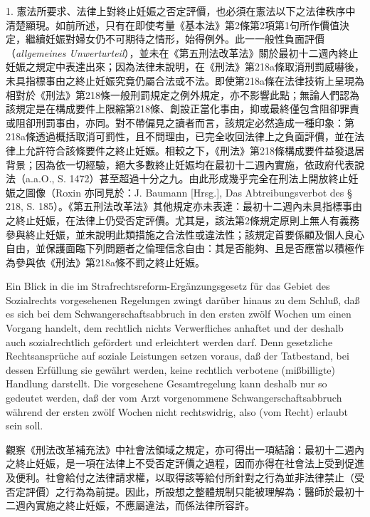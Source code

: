 \documentclass[12pt]{article}
\begin{document}
\begin{transpara}
1. 憲法所要求、法律上對終止妊娠之否定評價，也必須在憲法以下之法律秩序中清楚顯現。如前所述，只有在即使考量《基本法》第2條第2項第1句\ggfnArtTwoTwoOneZH{}所作價值決定，繼續妊娠對婦女仍不可期待之情形，始得例外。此一一般性負面評價（\textit{allgemeines Unwerturteil}），並未在《第五刑法改革法》關於最初十二週內終止妊娠之規定中表達出來；因為法律未說明，在《刑法》第218a條取消刑罰威嚇後，未具指標事由之終止妊娠究竟仍屬合法或不法。即使第218a條在法律技術上呈現為相對於《刑法》第218條一般刑罰規定之例外規定，亦不影響此點；無論人們認為該規定是在構成要件上限縮第218條、創設正當化事由，抑或最終僅包含阻卻罪責或阻卻刑罰事由，亦同。對不帶偏見之讀者而言，該規定必然造成一種印象：第218a條透過概括取消可罰性，且不問理由，已完全收回法律上之負面評價，並在法律上允許符合該條要件之終止妊娠。相較之下，《刑法》第218條構成要件益發退居背景；因為依一切經驗，絕大多數終止妊娠均在最初十二週內實施，依政府代表說法（a.a.O., S. 1472）甚至超過十分之九。由此形成幾乎完全在刑法上開放終止妊娠之圖像（Roxin 亦同見於：J. Baumann [Hrsg.], Das Abtreibungsverbot des § 218, S. 185）。《第五刑法改革法》其他規定亦未表達：最初十二週內未具指標事由之終止妊娠，在法律上仍受否定評價。尤其是，該法第2條規定原則上無人有義務參與終止妊娠，並未說明此類措施之合法性或違法性；該規定首要係顧及個人良心自由，並保護面臨下列問題者之倫理信念自由：其是否能夠、且是否應當以積極作為參與依《刑法》第218a條不罰之終止妊娠。
\end{transpara}

\syncleft
\begin{sourcepara}
Ein Blick in die im Strafrechtsreform-Ergänzungsgesetz für das Gebiet des Sozialrechts vorgesehenen Regelungen zwingt darüber hinaus zu dem Schluß, daß es sich bei dem Schwangerschaftsabbruch in den ersten zwölf Wochen um einen Vorgang handelt, dem rechtlich nichts Verwerfliches anhaftet und der deshalb auch sozialrechtlich gefördert und erleichtert werden darf. Denn gesetzliche Rechtsansprüche auf soziale Leistungen setzen voraus, daß der Tatbestand, bei dessen Erfüllung sie gewährt werden, keine rechtlich verbotene (mißbilligte) Handlung darstellt. Die vorgesehene Gesamtregelung kann deshalb nur so gedeutet werden, daß der vom Arzt vorgenommene Schwangerschaftsabbruch während der ersten zwölf Wochen nicht rechtswidrig, also (vom Recht) erlaubt sein soll.
\end{sourcepara}
\begin{transpara}
觀察《刑法改革補充法》中社會法領域之規定，亦可得出一項結論：最初十二週內之終止妊娠，是一項在法律上不受否定評價之過程，因而亦得在社會法上受到促進及便利。社會給付之法律請求權，以取得該等給付所針對之行為並非法律禁止（受否定評價）之行為為前提。因此，所設想之整體規制只能被理解為：醫師於最初十二週內實施之終止妊娠，不應屬違法，而係法律所容許。
\end{transpara}
\end{document}
